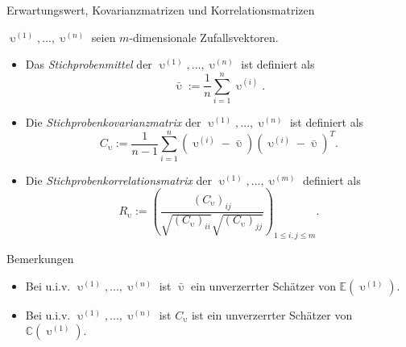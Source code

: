 \documentclass[
  8pt,
  ignorenonframetext,
]{beamer}
\providecommand{\tightlist}{%
  \setlength{\itemsep}{0pt}\setlength{\parskip}{0pt}}
\DeclareMathOperator*{\ups}{\upsilon}
\begin{document}
\begin{frame}{Erwartungswert, Kovarianzmatrizen und
Korrelationsmatrizen}
\protect\hypertarget{erwartungswert-kovarianzmatrizen-und-korrelationsmatrizen-5}{}
\footnotesize
\begin{definition}
\justifying
$\ups^{(1)},...,\ups^{(n)}$ seien $m$-dimensionale Zufallsvektoren.
\begin{itemize}
\item Das \textit{Stichprobenmittel} der $\ups^{(1)},...,\ups^{(n)}$ ist definiert als
\begin{equation}
\bar{\ups} := \frac{1}{n} \sum_{i=1}^n {\ups}^{(i)}.
\end{equation}
\item Die \textit{Stichprobenkovarianzmatrix} der $\ups^{(1)},...,\ups^{(n)}$ ist definiert als
\begin{equation}
C_{\ups} := \frac{1}{n-1}\sum_{i=1}^n ({\ups}^{(i)} - \bar{\ups})({\ups}^{(i)} - \bar{\ups})^T .
\end{equation}
\item Die \textit{Stichprobenkorrelationsmatrix} der $\ups^{(1)},...,\ups^{(m)}$ definiert als
\begin{equation}
R_{\ups} := \left(\frac{(C_{\ups})_{ij}}{\sqrt{ (C_{\ups})_{ii}}\sqrt{ (C_{\ups})_{jj}}}\right)_{1 \le i,j \le m}.
\end{equation}
\end{itemize}
\end{definition}
\vspace{-3mm}

Bemerkungen

\begin{itemize}
\tightlist
\item
  Bei u.i.v. \(\ups^{(1)},...,\ups^{(n)}\) ist \(\bar{\ups}\) ein
  unverzerrter Schätzer von \(\mathbb{E}(\ups^{(1)})\).
\item
  Bei u.i.v. \(\ups^{(1)},...,\ups^{(n)}\) ist \(C_{\ups}\) ist ein
  unverzerrter Schätzer von \(\mathbb{C}(\ups^{(1)})\).
\end{itemize}
\end{frame}
\end{document}
